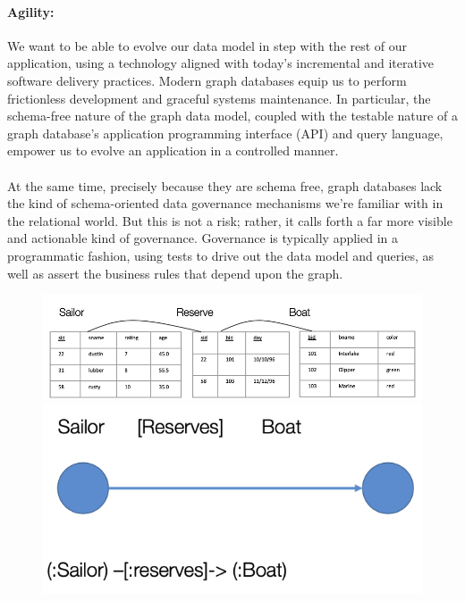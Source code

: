 \documentclass[10pt,a4paper]{article}
\newcommand{\nline}{\\~\\}
\begin{document}
\paragraph{Agility:} 
We want to be able to evolve our data model in step with the rest of our application, using a technology aligned with today’s incremental and iterative software delivery practices. Modern graph databases equip us to perform frictionless development and graceful systems maintenance. In particular, the schema-free nature of the graph data model, coupled with the testable nature of a graph database’s application programming interface (API) and query language, empower us to evolve an application in a controlled manner. 
\nline
At the same time, precisely because they are schema free, graph databases lack the kind of schema-oriented data governance mechanisms we’re familiar with in the relational world. But this is not a risk; rather, it calls forth a far more visible and actionable kind of governance. Governance is typically applied in a programmatic fashion, using tests to drive out the data model and queries, as well as assert the business rules that depend upon the graph.
\begin{figure}[h!]
\begin{minipage}{.5\textwidth}
  \centering
  \includegraphics[width=.9\linewidth]{images/relational-db}
\end{minipage}%
\begin{minipage}{.5\textwidth}
  \centering
  \includegraphics[width=.7\linewidth]{images/graph-db}
\end{minipage}
\end{figure}
\end{document}
